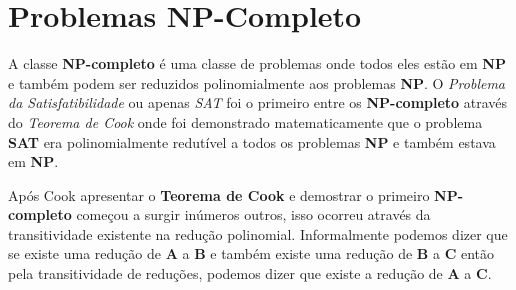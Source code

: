 \section{Problemas NP-Completo}

A classe \textbf{NP-completo} é uma classe de problemas onde todos eles estão em \textbf{NP} e também podem ser reduzidos polinomialmente aos problemas \textbf{NP}. 
O \textit{Problema da Satisfatibilidade} ou apenas \textit{SAT} foi o primeiro entre os \textbf{NP-completo} através do \textit{Teorema de Cook} onde foi demonstrado matematicamente que o problema \textbf{SAT} era polinomialmente redutível a todos os problemas \textbf{NP} e também estava em \textbf{NP}.

Após Cook apresentar o \textbf{Teorema de Cook} e demostrar o primeiro \textbf{NP-completo} começou a surgir inúmeros outros, isso ocorreu através da transitividade existente na redução polinomial. Informalmente podemos dizer que se existe uma redução de \textbf{A} a \textbf{B} e também existe uma redução de \textbf{B} a \textbf{C} então pela transitividade de reduções,  podemos dizer que existe a redução de \textbf{A} a \textbf{C}. 
